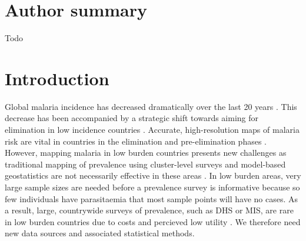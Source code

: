 \documentclass[10pt,letterpaper]{article}
\begin{document}
\section*{Author summary}
Todo


\linenumbers

\section*{Introduction}



Global malaria incidence has decreased dramatically over the last 20 years \cite{abajobir2017global, bhatt2015effect}.
This decrease has been accompanied by a strategic shift towards aiming for elimination in low incidence countries \cite{world2016world, newby2016path}.
Accurate, high-resolution maps of malaria risk are vital in countries in the elimination and pre-elimination phases \cite{sturrock2016mapping, cohen2017mapping}.
However, mapping malaria in low burden countries presents new challenges as traditional mapping of prevalence \cite{gething2011new, bhatt2017improved, gething2012long, bhatt2015effect} using cluster-level surveys and model-based geostatistics are not necessarily effective in these areas \cite{sturrock2016mapping, sturrock2014fine}.
In low burden areas, very large sample sizes are needed before a prevalence survey is informative because so few individuals have parasitaemia that most sample points will have no cases.
As a result, large, countrywide surveys of prevalence, such as DHS or MIS, are rare in low burden countries due to costs and percieved low utility \cite{dhs}.
We therefore need new data sources and associated statistical methods.

\end{document}
